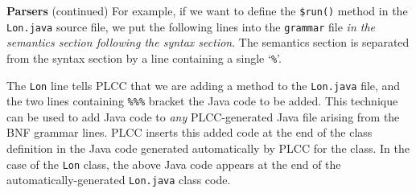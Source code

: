 \begin{minipage}[t]{\sw}
\slidenumber
\LARGE
{\bf Parsers} (continued)\exx
\emm\LightBox{\MYlonGrammarKleene}\exx
For example, if we want to define the \verb'$run()' method
in the \verb'Lon.java' source file,
we put the following lines into the \verb'grammar' file
{\em in the semantics section following the syntax section}.
The semantics section is separated from the syntax section
by a line containing a single `\verb'%''.
{\Large
{}
}
The \verb'Lon' line tells PLCC that we are adding a method
to the \verb'Lon.java' file,
and the two lines containing \verb'%%%'
bracket the Java code to be added.
This technique can be used to add Java code
to {\em any} PLCC-generated Java file arising
from the BNF grammar lines.
PLCC inserts this added code at the end of the class definition
in the Java code generated automatically by PLCC for the class.
In the case of the \verb'Lon' class,
the above Java code appears at the end
of the automatically-generated \verb'Lon.java' class code.\exx
\end{minipage}
\clearpage

